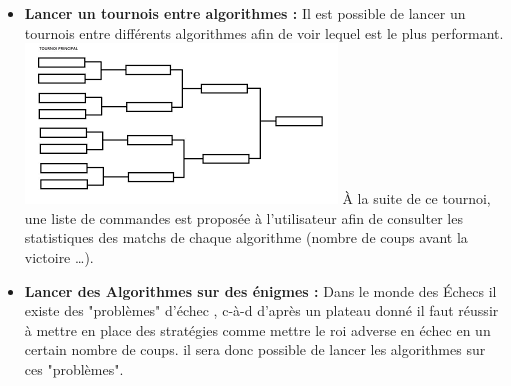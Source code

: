\documentclass{article}
\begin{document}
\begin{itemize}
    \medskip
    \item \textbf{Lancer un tournois entre algorithmes : }
    \newline
        Il est possible de lancer un tournois entre différents algorithmes afin de voir lequel est le plus performant.
        \newline
        \includegraphics[scale = 1]{tournoi.png}
        \newline
        À la suite de ce tournoi, une liste de commandes est proposée à l'utilisateur afin de consulter les 
        statistiques des matchs de chaque algorithme (nombre de coups avant la victoire \dots).
    \medskip
    \item \textbf{Lancer des Algorithmes sur des énigmes : }
    \newline
        Dans le monde des Échecs il existe des "problèmes" d'échec \cite{Krt}, c-à-d d'après un plateau donné il faut réussir à mettre en place des stratégies comme mettre le roi adverse en échec en un certain nombre de coups.\newline
        il sera donc possible de lancer les algorithmes sur ces "problèmes". 
\end{itemize}
\end{document}

